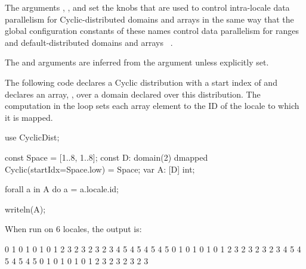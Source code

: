 The
arguments , ,
and  set the knobs that are used to
control intra-locale data parallelism for Cyclic-distributed domains
and arrays in the same way that the global configuration constants of
these names control data parallelism for ranges and
default-distributed domains and arrays ~.

The  and  arguments are inferred from the
 argument unless explicitly set.

\begin{example}
The following code declares a Cyclic distribution with a start index
of  and declares an array, , over a domain
declared over this distribution.  The computation in the 
loop sets each array element to the ID of the locale to which it is
mapped.
\begin{chapel}
use CyclicDist;

const Space = [1..8, 1..8];
const D: domain(2) dmapped Cyclic(startIdx=Space.low) = Space;
var A: [D] int;

forall a in A do
  a = a.locale.id;

writeln(A);
\end{chapel}
When run on 6 locales, the output is:
\begin{chapel}
0 1 0 1 0 1 0 1
2 3 2 3 2 3 2 3
4 5 4 5 4 5 4 5
0 1 0 1 0 1 0 1
2 3 2 3 2 3 2 3
4 5 4 5 4 5 4 5
0 1 0 1 0 1 0 1
2 3 2 3 2 3 2 3
\end{chapel}
\end{example}
